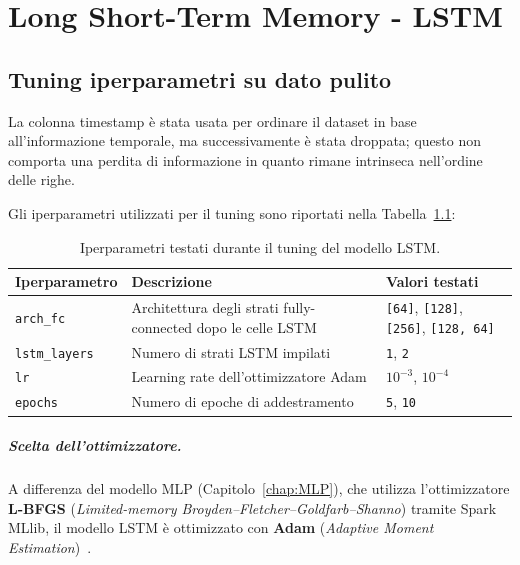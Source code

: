 \documentclass[../main.tex]{subfiles}
\begin{document}
\chapter{Long Short-Term Memory - LSTM}
\label{chap:LSTM}

\section{Tuning iperparametri su dato pulito}
La colonna timestamp è stata usata per ordinare il dataset in base all'informazione temporale, ma successivamente è stata droppata; questo non comporta una perdita di informazione in quanto rimane intrinseca nell'ordine delle righe.

Gli iperparametri utilizzati per il tuning sono riportati nella Tabella~\ref{tab:lstm_iperparametri}:

\begin{table}[H]
    \centering
    \begin{tabular}{|l|p{5cm}|p{5cm}|}
        \hline
        \textbf{Iperparametro} & \textbf{Descrizione} & \textbf{Valori testati} \\
        \hline
        \texttt{arch\_fc}
          & Architettura degli strati fully-connected dopo le celle LSTM & \texttt{[64]}, \texttt{[128]}, \texttt{[256]}, \texttt{[128, 64]} \\ \hline
        \texttt{lstm\_layers}
          & Numero di strati LSTM impilati & \texttt{1}, \texttt{2} \\ \hline
        \texttt{lr}
          & Learning rate dell'ottimizzatore Adam & \texttt{$10^{-3}$}, \texttt{$10^{-4}$} \\ \hline
        \texttt{epochs}
          & Numero di epoche di addestramento & \texttt{5}, \texttt{10} \\ \hline
    \end{tabular}
    \caption{Iperparametri testati durante il tuning del modello LSTM.}
    \label{tab:lstm_iperparametri}
\end{table}

\paragraph{Scelta dell'ottimizzatore.}
A differenza del modello MLP (Capitolo~\ref{chap:MLP}), che utilizza l'ottimizzatore \textbf{L-BFGS} (\textit{Limited-memory Broyden–Fletcher–Goldfarb–Shanno}) tramite Spark MLlib, il modello LSTM è ottimizzato con \textbf{Adam} (\textit{Adaptive Moment Estimation})~\cite{kingma2017adammethodstochasticoptimization}.
\end{document}
